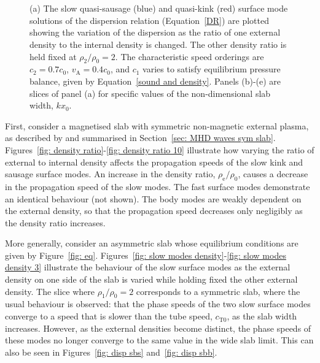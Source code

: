 \begin{figure}
	\centering
	 \\
	 \\
	\caption{(a) The slow quasi-sausage (blue) and quasi-kink (red) surface mode solutions of the dispersion relation (Equation~\eqref{DR}) are plotted showing the variation of the dispersion as the ratio of one external density to the internal density is changed. The other density ratio is held fixed at $\rho_2/\rho_0=2$. The characteristic speed orderings are $c_2=0.7c_0$, $v_\textrm{A}=0.4c_0$, and $c_1$ varies to satisfy equilibrium pressure balance, given by Equation~\eqref{sound and density}. Panels (b)-(e) are slices of panel (a) for specific values of the non-dimensional slab width, $kx_0$.}
\end{figure}


First, consider a magnetised slab with symmetric non-magnetic external plasma, as described by \cite{rob81b} and summarised in Section~\ref{sec: MHD waves sym slab}. Figures~\ref{fig: density ratio}-\ref{fig: density ratio 10} illustrate how varying the ratio of external to internal density affects the propagation speeds of the slow kink and sausage surface modes. An increase in the density ratio, $\rho_\textrm{e}/\rho_0$, causes a decrease in the propagation speed of the slow modes. The fast surface modes demonstrate an identical behaviour (not shown). The body modes are weakly dependent on the external density, so that the propagation speed decreases only negligibly as the density ratio increases.

More generally, consider an asymmetric slab whose equilibrium conditions are given by Figure~\ref{fig: eq}. Figures~\ref{fig: slow modes density}-\ref{fig: slow modes density 3} illustrate the behaviour of the slow surface modes as the external density on one side of the slab is varied while holding fixed the other external density. The slice where $\rho_1/\rho_0 = 2$ corresponds to a symmetric slab, where the usual behaviour is observed: that the phase speeds of the two slow surface modes converge to a speed that is slower than the tube speed, $c_\textrm{T0}$, as the slab width increases. However, as the external densities become distinct, the phase speeds of these modes no longer converge to the same value in the wide slab limit. This can also be seen in Figures~\ref{fig: disp sbs} and~\ref{fig: disp sbb}.

